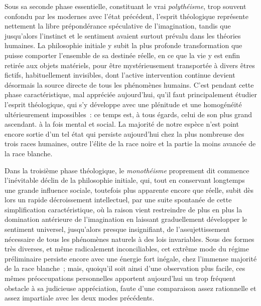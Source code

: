 \documentclass[french,twoside]{book} %
\begin{document}
Sous sa seconde phase essentielle, constituant le vrai {\itshape polythéisme}, trop souvent confondu par les modernes avec l’état précédent, l’esprit théologique représente nettement la libre prépondérance spéculative de l’imagination, tandis que jusqu’alors l’instinct et le sentiment avaient surtout prévalu dans les théories humaines. La philosophie initiale y subit la plus profonde transformation que puisse comporter l’ensemble de sa destinée réelle, en ce que la vie y est enfin retirée aux objets matériels, pour être mystérieusement transportée à divers êtres fictifs, habituellement invisibles, dont l’active intervention continue devient désormais la source directe de tous les phénomènes humains. C’est pendant cette phase caractéristique, mal appréciée aujourd’hui, qu’il faut principalement étudier l’esprit théologique, qui s’y développe avec une plénitude et une homogénéité ultérieurement impossibles : ce temps est, à tous égards, celui de son plus grand ascendant. à la fois mental et social. La majorité de notre espèce n’est point encore sortie d’un tel état qui persiste aujourd’hui chez la plus nombreuse des trois races humaines, outre l’élite de la race noire et la partie la moins avancée de la race blanche.\par
Dans la troisième phase théologique, le {\itshape monothéisme} proprement dit commence l’inévitable déclin de la philosophie initiale, qui, tout en conservant longtemps une grande influence sociale, toutefois plus apparente encore que réelle, subit dès lors un rapide décroissement intellectuel, par une suite spontanée de cette simplification caractéristique, où la raison vient restreindre de plus en plus la domination antérieure de l’imagination en laissant graduellement développer le sentiment universel, jusqu’alors presque insignifiant, de l’assujettissement nécessaire de tous les phénomènes naturels à des lois invariables. Sous des formes très diverses, et même radicalement inconciliables, cet extrême mode du régime préliminaire persiste encore avec une énergie fort inégale, chez l’immense majorité de la race blanche ; mais, quoiqu’il soit ainsi d’une observation plus facile, ces mêmes préoccupations personnelles apportent aujourd’hui un trop fréquent obstacle à sa judicieuse appréciation, faute d’une comparaison assez rationnelle et assez impartiale avec les deux modes précédents.\par
\end{document}

